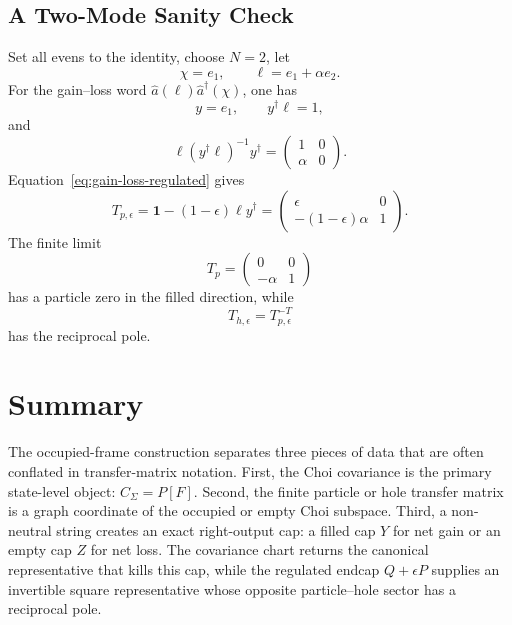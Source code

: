 \documentclass[aps,prb,onecolumn,nofootinbib,superscriptaddress]{revtex4-2}
\newcommand{\Id}{\mathbf{1}}
\newcommand{\ahat}{\hat a}
\newcommand{\eps}{\epsilon}
\begin{document}
\subsection{A Two-Mode Sanity Check}

Set all evens to the identity, choose \(N=2\), let
\begin{equation}
  \chi=e_1,\qquad \ell=e_1+\alpha e_2 .
\end{equation}
For the gain--loss word \(\ahat(\ell)\ahat^\dagger(\chi)\), one has
\begin{equation}
  y=e_1,\qquad y^\dagger\ell=1,
\end{equation}
and
\begin{equation}
  \ell(y^\dagger\ell)^{-1}y^\dagger
  =
  \begin{pmatrix}
    1 & 0\\
    \alpha & 0
  \end{pmatrix}.
\end{equation}
Equation~\eqref{eq:gain-loss-regulated} gives
\begin{equation}
  T_{p,\eps}
  =
  \Id-(1-\eps)\ell y^\dagger
  =
  \begin{pmatrix}
    \eps & 0\\
    -(1-\eps)\alpha & 1
  \end{pmatrix}.
\end{equation}
The finite limit
\begin{equation}
  T_p=
  \begin{pmatrix}
    0 & 0\\
    -\alpha & 1
  \end{pmatrix}
\end{equation}
has a particle zero in the filled direction, while
\begin{equation}
  T_{h,\eps}=T_{p,\eps}^{-T}
\end{equation}
has the reciprocal pole.

\section{Summary}

The occupied-frame construction separates three pieces of data that are often
conflated in transfer-matrix notation.
First, the Choi covariance is the primary state-level object:
\(C_\Sigma=P[F]\).  Second, the finite particle or hole transfer matrix is a
graph coordinate of the occupied or empty Choi subspace.  Third, a non-neutral
string creates an exact right-output cap: a filled cap \(Y\) for net gain or
an empty cap \(Z\) for net loss.  The covariance chart returns the canonical
representative that kills this cap, while the regulated endcap
\(Q+\eps P\) supplies an invertible square representative whose opposite
particle--hole sector has a reciprocal pole.
\end{document}

